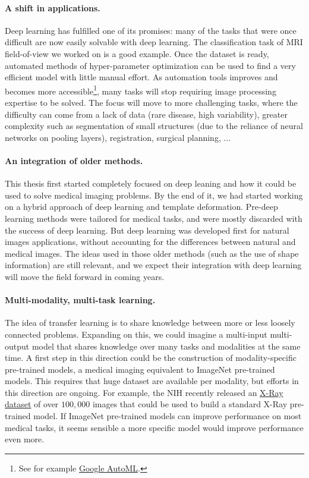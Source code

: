 \paragraph*{A shift in applications.}
Deep learning has fulfilled one of its promises: many of the tasks that were once difficult are now easily solvable with deep learning. The classification task of MRI field-of-view we worked on is a good example. Once the dataset is ready, automated methods of hyper-parameter optimization can be used to find a very efficient model with little manual effort. As automation tools improves and becomes more accessible\footnote{See for example \href{https://cloud.google.com/automl/}{Google AutoML}.}, many tasks will stop requiring image processing expertise to be solved. The focus will move to more challenging tasks, where the difficulty can come from a lack of data (rare disease, high variability), greater complexity such as segmentation of small structures (due to the reliance of neural networks on pooling layers), registration, surgical planning, ...

\paragraph*{An integration of older methods.}
This thesis first started completely focused on deep leaning and how it could be used to solve medical imaging problems. By the end of it, we had started working on a hybrid approach of deep learning and template deformation. Pre-deep learning methods were tailored for medical tasks, and were mostly discarded with the success of deep learning. But deep learning was developed first for natural images applications, without accounting for the differences between natural and medical images. The ideas used in those older methods (such as the use of shape information) are still relevant, and we expect their integration with deep learning will move the field forward in coming years.

\paragraph*{Multi-modality, multi-task learning.}
The idea of transfer learning is to share knowledge between more or less loosely connected problems. Expanding on this, we could imagine a multi-input multi-output model that shares knowledge over many tasks and modalities at the same time. A first step in this direction could be the construction of modality-specific pre-trained models, a medical imaging equivalent to ImageNet pre-trained models. This requires that huge dataset are available per modality, but efforts in this direction are ongoing. For example, the NIH recently released an \href{https://nihcc.app.box.com/v/ChestXray-NIHCC}{X-Ray dataset} of over $100,000$ images that could be used to build a standard X-Ray pre-trained model. If ImageNet pre-trained models can improve performance on most medical tasks, it seems sensible a more specific model would improve performance even more.

